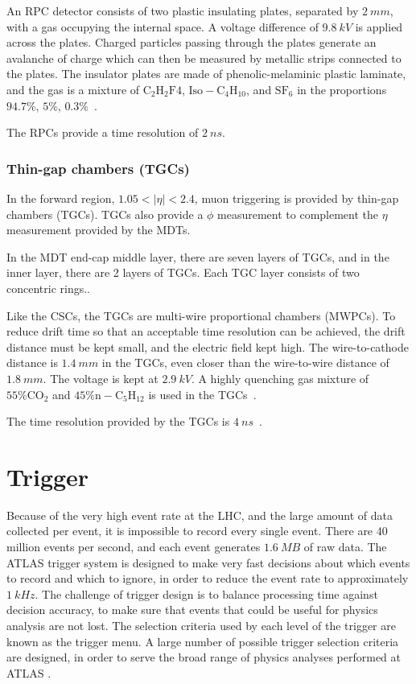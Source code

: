 An RPC detector consists of two plastic insulating plates, separated by $2~mm$, with a gas occupying the internal space.
A voltage difference of $9.8~kV$ is applied across the plates.
Charged particles passing through the plates generate an avalanche of charge which can then be measured by metallic strips connected to the plates.
The insulator plates are made of phenolic-melaminic plastic laminate,
and the gas is a mixture of $\mathrm{C_2 H_2 F4}$, $\mathrm{Iso-C_4 H_{10}}$, and $\mathrm{SF_6}$
in the proportions $94.7\%$, $5\%$, $0.3\%$~\cite{atlas-detector-2008}.

The RPCs provide a time resolution of $2~ns$.

\subsubsection{Thin-gap chambers (TGCs)}

In the forward region, $1.05 < |\eta| < 2.4$, muon triggering is provided by thin-gap chambers (TGCs).
TGCs also provide a $\phi$ measurement to complement the $\eta$ measurement provided by the MDTs.

In the MDT end-cap middle layer, there are seven layers of TGCs, and in the inner layer, there are 2 layers of TGCs.
Each TGC layer consists of two concentric rings..

Like the CSCs, the TGCs are multi-wire proportional chambers (MWPCs).
To reduce drift time so that an acceptable time resolution can be achieved, the drift distance must be kept small,
and the electric field kept high.
The wire-to-cathode distance is $1.4~mm$ in the TGCs, even closer than the wire-to-wire distance of $1.8~mm$.
The voltage is kept at $2.9~kV$.
A highly quenching gas mixture of $55\% \mathrm{CO_2}$ and $45\% \mathrm{n-C_5 H_{12}}$ is used in the TGCs~\cite{atlas-detector-2008}.

The time resolution provided by the TGCs is $4~ns$~\cite{muon-2003}.

\section{Trigger}\label{sec:trigger}

Because of the very high event rate at the LHC, and the large amount of data collected per event,
it is impossible to record every single event.
There are 40 million events per second, and each event generates $1.6~MB$ of raw data.
The ATLAS trigger system is designed to make very fast decisions about which events to record and which to ignore,
in order to reduce the event rate to approximately $1~kHz$.
The challenge of trigger design is to balance processing time against decision accuracy,
to make sure that events that could be useful for physics analysis are not lost.
The selection criteria used by each level of the trigger are known as the trigger menu.
A large number of possible trigger selection criteria are designed, in order to serve the broad range of physics analyses performed at ATLAS .

